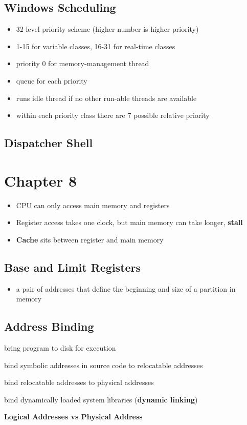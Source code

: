 \documentclass[11pt]{article}
\begin{document}
\subsection{Windows Scheduling}
\label{sec:org0737c85}
\begin{itemize}
\item 32-level priority scheme (higher number is higher priority)
\item 1-15 for variable classes, 16-31 for real-time classes
\item priority 0 for memory-management thread
\item queue for each priority
\item runs idle thread if no other run-able threads are available

\item within each priority class there are 7 possible relative priority
\end{itemize}

\subsection{Dispatcher Shell}
\label{sec:org0882241}
\section{Chapter 8}
\label{sec:org8859ca0}
\begin{itemize}
\item CPU can only access main memory and registers
\item Register access takes one clock, but main memory can take longer, \textbf{stall}
\item \textbf{Cache} sits between register and main memory
\end{itemize}
\subsection{Base and Limit Registers}
\label{sec:orge61c99f}
\begin{itemize}
\item a pair of addresses that define the beginning and size of a partition in memory
\end{itemize}
\subsection{Address Binding}
\label{sec:orgb97dbd4}
\begin{description}
\item[{input queue}] bring program to disk for execution
\item[{compile time}] bind symbolic addresses in source code to relocatable addresses
\item[{load time}] bind relocatable addresses to physical addresses
\item[{execution time}] bind dynamically loaded system libraries (\textbf{dynamic linking})
\item \textbf{Logical Addresses vs Physical Address}
\end{description}
\end{document}
